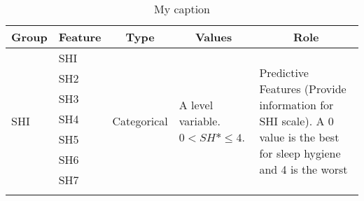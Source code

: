 \documentclass[10pt,letterpaper,oneside]{article}
\begin{document}
\begin{table}[]
	\centering
	\caption{My caption}
	\label{my-label}
	\begin{tabular}{|l|l|l|l|l|}
		\hline
		\multicolumn{1}{|c|}{\textbf{Group}} & \multicolumn{1}{c|}{\textbf{Feature}} & \multicolumn{1}{c|}{\textbf{Type}} & \multicolumn{1}{c|}{\textbf{Values}} & \multicolumn{1}{c|}{\textbf{Role}}   \\ \hline
		\multirow{21}{*}{SHI}  & SHI  & \multirow{21}{*}{Categorical} & \multirow{21}{3cm}{A level variable. $ 0 < SH*\leq 4 $.} & \multirow{21}{5cm}{Predictive Features (Provide information for SHI scale). A 0 value is the best for sleep hygiene and 4 is the worst} \\ \cline{2-2}
		& SH2                                   &                                    &                                                        &                                                                                                                                         \\ \cline{2-2}
		& SH3                                   &                                    &                                                        &                                                                                                                                         \\ \cline{2-2}
		& SH4                                   &                                    &                                                        &                                                                                                                                         \\ \cline{2-2}
		& SH5                                   &                                    &                                                        &                                                                                                                                         \\ \cline{2-2}
		& SH6                                   &                                    &                                                        &                                                                                                                                         \\ \cline{2-2}
		& SH7                                   &                                    &                                                        &                                                                                                                                         \\ \cline{2-2}

\end{tabular}
\end{table}
\end{document}
